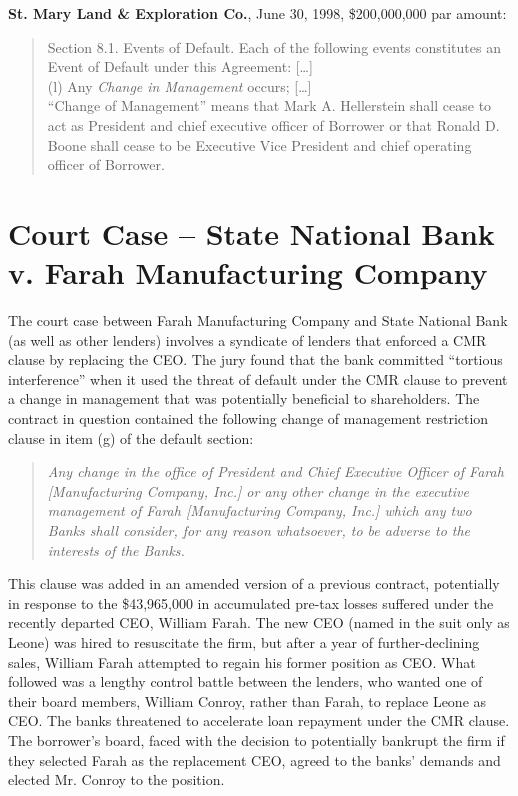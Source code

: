 \documentclass[12pt]{article}
\begin{document}
\begin{appendices}
\noindent
\textbf{St. Mary Land \& Exploration Co.}, June 30, 1998, \$200,000,000 par amount:
\begin{quote}
\singlespacing \vspace{-8pt}
Section 8.1. Events of Default. Each of the following events constitutes an Event of Default under this Agreement:  [\dots]\\
(l) Any \textit{Change in Management} occurs;  [\dots]\\
``Change of Management'' means that Mark A. Hellerstein shall cease to act as President and chief executive officer of Borrower or that Ronald D. Boone shall cease to be Executive Vice President and chief operating officer of Borrower.
\end{quote}








\section{Court Case -- State National Bank v. Farah Manufacturing Company}
 \label{IApp:court_case}

The court case between Farah Manufacturing Company and State National Bank (as well as other lenders) involves a syndicate of lenders that enforced a CMR clause by replacing the CEO.
The jury found that the bank committed ``tortious interference'' when it used the threat of default under the CMR clause to prevent a change in management that was potentially beneficial to shareholders.
The contract in question contained the following change of management restriction clause in item (g) of the default section:

\begin{quote}
    \singlespacing
   \textit{
    Any change in the office of President and Chief Executive Officer of Farah [Manufacturing Company, Inc.] or any other change in the executive management of Farah [Manufacturing Company, Inc.] which any two Banks shall consider, for any reason whatsoever, to be adverse to the interests of the Banks.
   }
\end{quote}

This clause was added in an amended version of a previous contract, potentially in response to the \$43,965,000 in accumulated pre-tax losses suffered under the recently departed CEO, William Farah.
The new CEO (named in the suit only as Leone) was hired to resuscitate the firm, but after a year of further-declining sales, William Farah attempted to regain his former position as CEO.
What followed was a lengthy control battle between the lenders, who wanted one of their board members, William Conroy, rather than Farah, to replace Leone as CEO.
The banks threatened to accelerate loan repayment under the CMR clause.
The borrower's board, faced with the decision to potentially bankrupt the firm if they selected Farah as the replacement CEO, agreed to the banks' demands and elected Mr. Conroy to the position.



\end{appendices}
\end{document}
